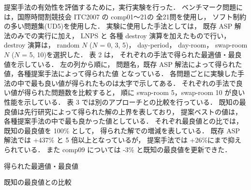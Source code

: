 提案手法の有効性を評価するために，実行実験を行った．
ベンチマーク問題には，国際時間割競技会 ITC2007 の comp01〜21の
全21問を使用し，
ソフト制約の多い問題集(UD5)を使用した．
実験に使用した手法としては，
既存 ASP 解法のみでの実行に加え，
LNPS と 各種 destroy 演算を加えたもので行い，
destroy 演算は，
random $N$ ($N$ = 0, 3, 5)，
day-period，
day-room，
swap-room $N$ ($N$ = 5, 10)を選択した．
表 2 は，
それぞれの手法で得られた最適値・最良値を示している．
左の列から順に，
問題名，既存 ASP 解法によって得られた値，各種提案手法によって得られた値
となっている．
各問題ごとに実験した手法の中で最も良い値が得られたものは太字で示してある．
それぞれの手法で良い値が得られた問題数を比較すると，
順に swap-room 5，swap-room 10 が良い性能を示している．
表 3 では別のアプローチとの比較を行っている．
既知の最良値は先行研究によって得られた解の上界を表しており，
提案ベストの値は，
各種提案手法の中で最も良かった値としている．
それぞれ最良値との比では，
既知の最良値を 100\% として，
得られた解での増減を表している．
既存 ASP 解法では +437\% と 5 倍以上となっているが，
提案手法では +26\%にまで抑えられている．
また comp09 については -3\% と既知の最良値を更新できた．

\begin{table*}[tbp]
  \label{table:bench:result1}
  \begin{center}
  \caption{得られた最適値・最良値}
\begin{tableA}
    
  \end{tableA}
  \end{center}
\end{table*}

\begin{table*}[tbp]
  \label{table:bench:result2}
  \centering
   \caption{既知の最良値との比較}
  \begin{tableB}
    
  \end{tableB}
\end{table*}